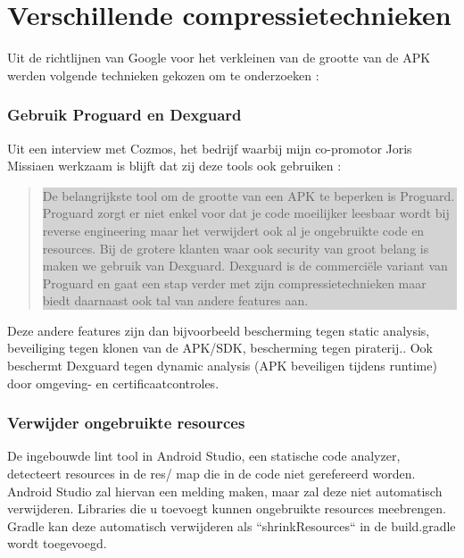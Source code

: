 \section{Verschillende compressietechnieken}
\label{sec:compressietechnieken}

Uit de richtlijnen van Google voor het verkleinen van de grootte van de APK werden volgende technieken gekozen om te onderzoeken \autocite{googlereduceapksize} : 

\subsubsection{Gebruik Proguard en Dexguard}
Uit een interview met Cozmos, het bedrijf waarbij mijn co-promotor Joris Missiaen werkzaam is blijft dat zij deze tools ook gebruiken : 
\begin{quote}
	\colorbox{lightgray}{\parbox{350px}{De belangrijkste tool om de grootte van een APK te beperken is Proguard. Proguard zorgt er niet enkel voor dat je code moeilijker leesbaar wordt bij reverse engineering maar het verwijdert ook al je ongebruikte code en resources.
	Bij de grotere klanten waar ook security van groot belang is maken we gebruik van Dexguard. Dexguard is de commerciële variant van Proguard en gaat een stap verder met zijn compressietechnieken maar biedt daarnaast ook tal van andere features aan.
	}}
\end{quote}
Deze andere features zijn dan bijvoorbeeld bescherming tegen static analysis, beveiliging tegen klonen van de APK/SDK, bescherming tegen piraterij.. Ook beschermt Dexguard tegen dynamic analysis (APK beveiligen tijdens runtime) door omgeving- en certificaatcontroles. 

\subsubsection{Verwijder ongebruikte resources}
\label{sec:removeunusedresources}
De ingebouwde lint tool in Android Studio, een statische code analyzer, detecteert resources in de res/ map die in de code niet gerefereerd worden. Android Studio zal hiervan een melding maken, maar zal deze niet automatisch verwijderen. Libraries die u toevoegt kunnen ongebruikte resources meebrengen. Gradle kan deze automatisch verwijderen als ``shrinkResources`` in de build.gradle wordt toegevoegd. 

